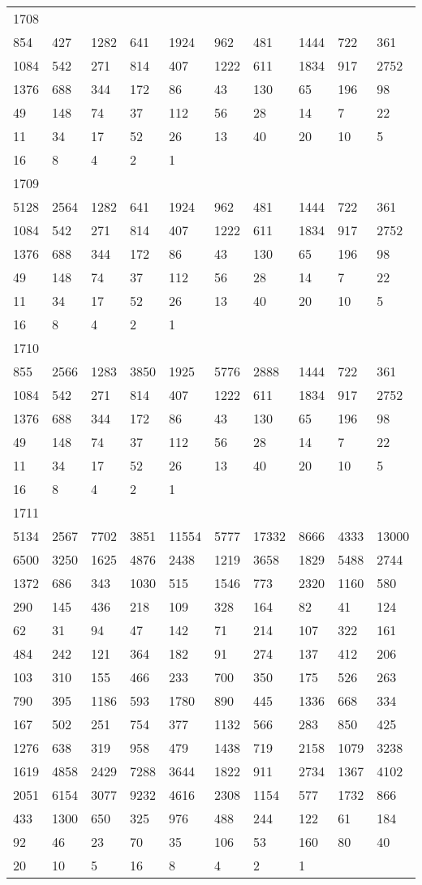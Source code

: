 \begin{longtable}{*{10}{l}}
1708&&&&&&&&&\\
854& 427& 1282& 641& 1924& 962& 481& 1444& 722& 361\\
1084& 542& 271& 814& 407& 1222& 611& 1834& 917& 2752\\
1376& 688& 344& 172& 86& 43& 130& 65& 196& 98\\
49& 148& 74& 37& 112& 56& 28& 14& 7& 22\\
11& 34& 17& 52& 26& 13& 40& 20& 10& 5\\
16& 8& 4& 2& 1& \\

1709&&&&&&&&&\\
5128& 2564& 1282& 641& 1924& 962& 481& 1444& 722& 361\\
1084& 542& 271& 814& 407& 1222& 611& 1834& 917& 2752\\
1376& 688& 344& 172& 86& 43& 130& 65& 196& 98\\
49& 148& 74& 37& 112& 56& 28& 14& 7& 22\\
11& 34& 17& 52& 26& 13& 40& 20& 10& 5\\
16& 8& 4& 2& 1& \\

1710&&&&&&&&&\\
855& 2566& 1283& 3850& 1925& 5776& 2888& 1444& 722& 361\\
1084& 542& 271& 814& 407& 1222& 611& 1834& 917& 2752\\
1376& 688& 344& 172& 86& 43& 130& 65& 196& 98\\
49& 148& 74& 37& 112& 56& 28& 14& 7& 22\\
11& 34& 17& 52& 26& 13& 40& 20& 10& 5\\
16& 8& 4& 2& 1& \\

1711&&&&&&&&&\\
5134& 2567& 7702& 3851& 11554& 5777& 17332& 8666& 4333& 13000\\
6500& 3250& 1625& 4876& 2438& 1219& 3658& 1829& 5488& 2744\\
1372& 686& 343& 1030& 515& 1546& 773& 2320& 1160& 580\\
290& 145& 436& 218& 109& 328& 164& 82& 41& 124\\
62& 31& 94& 47& 142& 71& 214& 107& 322& 161\\
484& 242& 121& 364& 182& 91& 274& 137& 412& 206\\
103& 310& 155& 466& 233& 700& 350& 175& 526& 263\\
790& 395& 1186& 593& 1780& 890& 445& 1336& 668& 334\\
167& 502& 251& 754& 377& 1132& 566& 283& 850& 425\\
1276& 638& 319& 958& 479& 1438& 719& 2158& 1079& 3238\\
1619& 4858& 2429& 7288& 3644& 1822& 911& 2734& 1367& 4102\\
2051& 6154& 3077& 9232& 4616& 2308& 1154& 577& 1732& 866\\
433& 1300& 650& 325& 976& 488& 244& 122& 61& 184\\
92& 46& 23& 70& 35& 106& 53& 160& 80& 40\\
20& 10& 5& 16& 8& 4& 2& 1& \\


\end{longtable}
